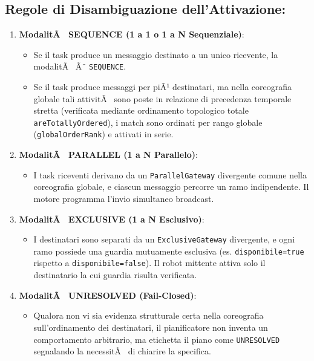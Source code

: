 ﻿\documentclass[11pt, a4paper]{report}
\begin{document}
\subsection{Regole di Disambiguazione dell'Attivazione:}
\begin{enumerate}
    \item \textbf{ModalitÃ  SEQUENCE (1 a 1 o 1 a N Sequenziale)}:
    \begin{itemize}
        \item Se il task produce un messaggio destinato a un unico ricevente, la modalitÃ  Ã¨ \texttt{SEQUENCE}.
        \item Se il task produce messaggi per piÃ¹ destinatari, ma nella coreografia globale tali attivitÃ  sono poste in relazione di precedenza temporale stretta (verificata mediante ordinamento topologico totale \texttt{areTotallyOrdered}), i match sono ordinati per rango globale (\texttt{globalOrderRank}) e attivati in serie.
    \end{itemize}
    \item \textbf{ModalitÃ  PARALLEL (1 a N Parallelo)}:
    \begin{itemize}
        \item I task riceventi derivano da un \texttt{ParallelGateway} divergente comune nella coreografia globale, e ciascun messaggio percorre un ramo indipendente. Il motore programma l'invio simultaneo broadcast.
    \end{itemize}
    \item \textbf{ModalitÃ  EXCLUSIVE (1 a N Esclusivo)}:
    \begin{itemize}
        \item I destinatari sono separati da un \texttt{ExclusiveGateway} divergente, e ogni ramo possiede una guardia mutuamente esclusiva (es. \texttt{disponibile=true} rispetto a \texttt{disponibile=false}). Il robot mittente attiva solo il destinatario la cui guardia risulta verificata.
    \end{itemize}
    \item \textbf{ModalitÃ  UNRESOLVED (Fail-Closed)}:
    \begin{itemize}
        \item Qualora non vi sia evidenza strutturale certa nella coreografia sull'ordinamento dei destinatari, il pianificatore non inventa un comportamento arbitrario, ma etichetta il piano come \texttt{UNRESOLVED} segnalando la necessitÃ  di chiarire la specifica.
    \end{itemize}
\end{enumerate}
\end{document}
